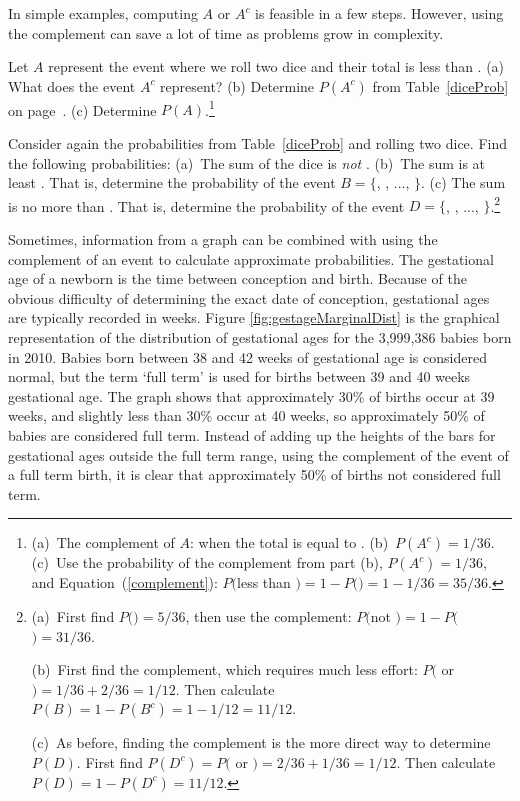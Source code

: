 In simple examples, computing $A$ or $A^c$ is feasible in a few steps. However, using the complement can save a lot of time as problems grow in complexity.

\begin{exercise}
Let $A$ represent the event where we roll two dice and their total is less than . (a) What does the event $A^c$ represent? (b) Determine $P(A^c)$ from Table~\ref{diceProb} on page~\pageref{diceProb}. (c) Determine $P(A)$.\footnote{(a)~The complement of $A$: when the total is equal to . (b)~$P(A^c) = 1/36$. (c)~Use the probability of the complement from part (b), $P(A^c) = 1/36$, and Equation~(\ref{complement}): $P($less than $) = 1 - P($$) = 1 - 1/36 = 35/36$.}
\end{exercise}

\begin{exercise} Consider again the probabilities from Table~\ref{diceProb} and rolling two dice. Find the following probabilities: (a)~The sum of the dice is \emph{not} . (b)~The sum is at least . That is, determine the probability of the event $B=\{$, , ..., $\}$. (c) The sum is no more than . That is, determine the probability of the event $D=\{$, , ..., $\}$.\footnote{(a)~First find $P($$)=5/36$, then use the complement: $P($not $) = 1 - P($$) = 31/36$.

(b)~First find  the complement, which requires much less effort: $P($ or $)=1/36+2/36=1/12$. Then calculate $P(B) = 1-P(B^c) = 1-1/12 = 11/12$.

(c)~As before, finding the complement is the more direct way to determine $P(D)$. First find $P(D^c) = P($ or $)=2/36 + 1/36=1/12$. Then calculate $P(D) = 1 - P(D^c) = 11/12$.}
\end{exercise}

Sometimes, information from a graph can be combined with using the complement of an event to calculate approximate probabilities. The gestational age of a newborn is the time between conception and birth. Because of the obvious difficulty of determining the exact date of conception, gestational ages are typically recorded in weeks. Figure \ref{fig:gestageMarginalDist} is the graphical representation of the distribution of gestational ages for the  3,999,386 babies born in 2010.  Babies born between 38 and 42 weeks of gestational age is considered normal, but the term `full term' is used for births between 39 and 40 weeks gestational age.  The graph shows that approximately 30\% of births occur at 39 weeks, and slightly less than 30\% occur at 40 weeks, so approximately 50\% of babies are considered full term.  Instead of adding up the heights of the bars for gestational ages outside the full term range, using the complement of the event of a full term birth, it is clear that approximately 50\% of births not considered full term.

